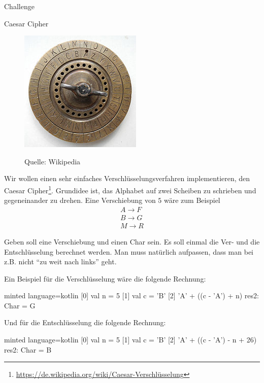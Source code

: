 \begin{task}[points=auto]{Challenge}
    \begin{subtask*}[points=0]{Caesar Cipher }
        \begin{figure}
            \begin{center}
                \includegraphics{caesar-cipher.jpg}
            \end{center}
            Quelle: Wikipedia
        \end{figure}
        Wir wollen einen sehr einfaches Verschlüsselungsverfahren implementieren, den Caesar Cipher\footnote{\url{https://de.wikipedia.org/wiki/Caesar-Verschlüsselung}}.
        Grundidee ist, das Alphabet auf zwei Scheiben zu schrieben und gegeneinander zu drehen.
        Eine Verschiebung von $5$ wäre zum Beispiel
        \begin{align*}
            A \to F \\
            B \to G \\
            M \to R
        \end{align*}

        Geben soll eine Verschiebung 
        und einen Char  sein.
        Es soll einmal die Ver- und die Entschlüsselung berechnet werden.
        Man muss natürlich aufpassen, dass man bei z.B.
         nicht \enquote{zu weit nach links} geht.

        \begin{solution}
            Ein Beispiel für die Verschlüsselung wäre die folgende Rechnung:
            \begin{codeBlock}[]{minted language=kotlin}
                [0] val n = 5
                [1] val c = 'B'
                [2] 'A' + ((c - 'A') + n) %
                res2: Char = G
            \end{codeBlock}
            Und für die Entschlüsselung die folgende Rechnung:
            \begin{codeBlock}[]{minted language=kotlin}
                [0] val n = 5
                [1] val c = 'B'
                [2] 'A' + ((c - 'A') - n + 26) %
                res2: Char = B
            \end{codeBlock}
        \end{solution}
    \end{subtask*}
\end{task}

